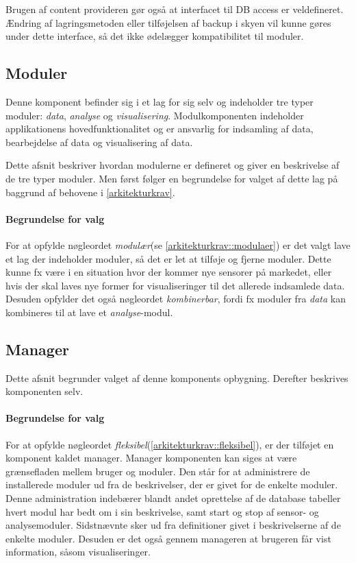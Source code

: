 Brugen af content provideren gør også at interfacet til DB access er veldefineret.
Ændring af lagringsmetoden eller tilføjelsen af backup i skyen vil kunne gøres under dette interface, så det ikke ødelægger kompatibilitet til moduler.

\subsection{Moduler}
Denne komponent befinder sig i et lag for sig selv og indeholder tre typer moduler: \textit{data}, \textit{analyse} og \textit{visualisering}.
Modulkomponenten indeholder applikationens hovedfunktionalitet og er ansvarlig for indsamling af data, bearbejdelse af data og visualisering af data.

Dette afsnit beskriver hvordan modulerne er defineret og giver en beskrivelse af de tre typer moduler.
Men først følger en begrundelse for valget af dette lag på baggrund af behovene i \cref{arkitekturkrav}.

\paragraph{Begrundelse for valg}
For at opfylde nøgleordet \textit{modulær}(se \cref{arkitekturkrav::modulaer}) er det valgt lave et lag der indeholder moduler, så det er let at tilføje og fjerne moduler.
Dette kunne fx være i en situation hvor der kommer nye sensorer på markedet, eller hvis der skal laves nye former for visualiseringer til det allerede indsamlede data.
Desuden opfylder det også nøgleordet \textit{kombinerbar}, fordi fx moduler fra \textit{data} kan kombineres til at lave et \textit{analyse}-modul.



\subsection{Manager}\label{subsec:arkitektur-Manager}
Dette afsnit begrunder valget af denne komponents opbygning.
Derefter beskrives komponenten selv.

\paragraph{Begrundelse for valg}
For at opfylde nøgleordet \textit{fleksibel}(\cref{arkitekturkrav::fleksibel}), er der tilføjet en komponent kaldet manager.
Manager komponenten kan siges at være grænsefladen mellem bruger og moduler.
Den står for at administrere de installerede moduler ud fra de beskrivelser, der er givet for de enkelte moduler.
Denne administration indebærer blandt andet oprettelse af de database tabeller hvert modul har bedt om i sin beskrivelse, samt start og stop af sensor- og analysemoduler.
Sidstnævnte sker ud fra definitioner givet i beskrivelserne af de enkelte moduler.
Desuden er det også gennem manageren at brugeren får vist information, såsom visualiseringer.

